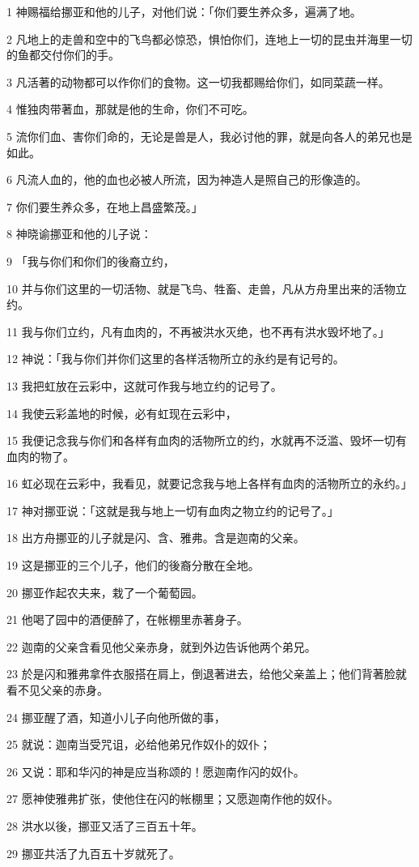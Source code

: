 \par 1 神赐福给挪亚和他的儿子，对他们说：「你们要生养众多，遍满了地。
\par 2 凡地上的走兽和空中的飞鸟都必惊恐，惧怕你们，连地上一切的昆虫并海里一切的鱼都交付你们的手。
\par 3 凡活著的动物都可以作你们的食物。这一切我都赐给你们，如同菜蔬一样。
\par 4 惟独肉带著血，那就是他的生命，你们不可吃。
\par 5 流你们血、害你们命的，无论是兽是人，我必讨他的罪，就是向各人的弟兄也是如此。
\par 6 凡流人血的，他的血也必被人所流，因为神造人是照自己的形像造的。
\par 7 你们要生养众多，在地上昌盛繁茂。」
\par 8 神晓谕挪亚和他的儿子说：
\par 9 「我与你们和你们的後裔立约，
\par 10 并与你们这里的一切活物、就是飞鸟、牲畜、走兽，凡从方舟里出来的活物立约。
\par 11 我与你们立约，凡有血肉的，不再被洪水灭绝，也不再有洪水毁坏地了。」
\par 12 神说：「我与你们并你们这里的各样活物所立的永约是有记号的。
\par 13 我把虹放在云彩中，这就可作我与地立约的记号了。
\par 14 我使云彩盖地的时候，必有虹现在云彩中，
\par 15 我便记念我与你们和各样有血肉的活物所立的约，水就再不泛滥、毁坏一切有血肉的物了。
\par 16 虹必现在云彩中，我看见，就要记念我与地上各样有血肉的活物所立的永约。」
\par 17 神对挪亚说：「这就是我与地上一切有血肉之物立约的记号了。」
\par 18 出方舟挪亚的儿子就是闪、含、雅弗。含是迦南的父亲。
\par 19 这是挪亚的三个儿子，他们的後裔分散在全地。
\par 20 挪亚作起农夫来，栽了一个葡萄园。
\par 21 他喝了园中的酒便醉了，在帐棚里赤著身子。
\par 22 迦南的父亲含看见他父亲赤身，就到外边告诉他两个弟兄。
\par 23 於是闪和雅弗拿件衣服搭在肩上，倒退著进去，给他父亲盖上；他们背著脸就看不见父亲的赤身。
\par 24 挪亚醒了酒，知道小儿子向他所做的事，
\par 25 就说：迦南当受咒诅，必给他弟兄作奴仆的奴仆；
\par 26 又说：耶和华闪的神是应当称颂的！愿迦南作闪的奴仆。
\par 27 愿神使雅弗扩张，使他住在闪的帐棚里；又愿迦南作他的奴仆。
\par 28 洪水以後，挪亚又活了三百五十年。
\par 29 挪亚共活了九百五十岁就死了。


